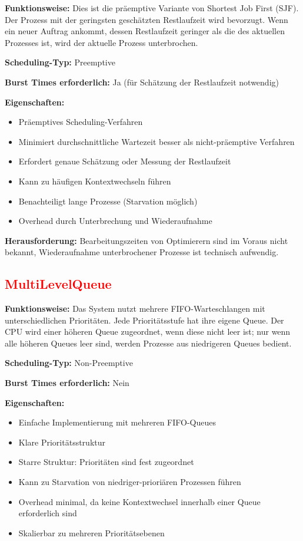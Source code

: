 \textbf{Funktionsweise:} Dies ist die präemptive Variante von Shortest Job First (SJF). Der Prozess mit der geringsten geschätzten Restlaufzeit wird bevorzugt. Wenn ein neuer Auftrag ankommt, dessen Restlaufzeit geringer als die des aktuellen Prozesses ist, wird der aktuelle Prozess unterbrochen.

\textbf{Scheduling-Typ:} Preemptive

\textbf{Burst Times erforderlich:} Ja (für Schätzung der Restlaufzeit notwendig)

\textbf{Eigenschaften:}
\begin{itemize}
    \item Präemptives Scheduling-Verfahren
    \item Minimiert durchschnittliche Wartezeit besser als nicht-präemptive Verfahren
    \item Erfordert genaue Schätzung oder Messung der Restlaufzeit
    \item Kann zu häufigen Kontextwechseln führen
    \item Benachteiligt lange Prozesse (Starvation möglich)
    \item Overhead durch Unterbrechung und Wiederaufnahme
\end{itemize}

\textbf{Herausforderung:} Bearbeitungszeiten von Optimierern sind im Voraus nicht bekannt, Wiederaufnahme unterbrochener Prozesse ist technisch aufwendig.

\subsection{\textcolor{red}{MultiLevelQueue}}

\textbf{Funktionsweise:} Das System nutzt mehrere FIFO-Warteschlangen mit unterschiedlichen Prioritäten. Jede Prioritätsstufe hat ihre eigene Queue. Der CPU wird einer höheren Queue zugeordnet, wenn diese nicht leer ist; nur wenn alle höheren Queues leer sind, werden Prozesse aus niedrigeren Queues bedient.

\textbf{Scheduling-Typ:} Non-Preemptive

\textbf{Burst Times erforderlich:} Nein

\textbf{Eigenschaften:}
\begin{itemize}
    \item Einfache Implementierung mit mehreren FIFO-Queues
    \item Klare Prioritätsstruktur
    \item Starre Struktur: Prioritäten sind fest zugeordnet
    \item Kann zu Starvation von niedriger-prioriären Prozessen führen
    \item Overhead minimal, da keine Kontextwechsel innerhalb einer Queue erforderlich sind
    \item Skalierbar zu mehreren Prioritätsebenen
\end{itemize}

